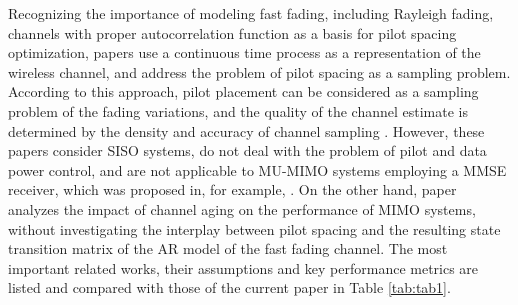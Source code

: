 \documentclass[conference, a4paper, 10pt]{IEEEtran}
\begin{document}
Recognizing the importance of modeling fast fading, including Rayleigh fading, channels with proper autocorrelation function as a basis for
pilot spacing optimization, papers \cite{Savazzi:09, Savazzi:09B} use a continuous time process as a representation of
the wireless channel, and address the problem of pilot spacing as a sampling problem. %
According to this approach, pilot placement can be considered as a sampling problem of the fading variations,
and the quality of the channel estimate is determined by the density and accuracy of channel sampling \cite{Savazzi:09B}.
However, these papers consider \ac{SISO} systems, do not deal with the problem of pilot and data power control, and
are not applicable to \ac{MU-MIMO} systems employing a \ac{MMSE} receiver, which was proposed in, for example, \cite{Fodor:21}.
On the other hand, paper \cite{Truong:13} analyzes the impact of channel aging on the performance of MIMO systems, without investigating the interplay between pilot spacing and the resulting state transition matrix of the \ac{AR} model of the fast fading channel.
The most important related works, their assumptions and key performance metrics are listed and compared with those
of the current paper in Table \ref{tab:tab1}.
\end{document}
